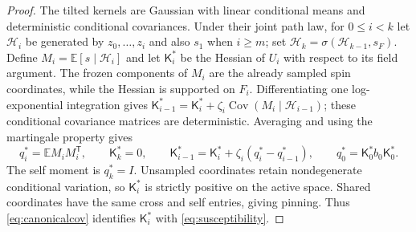 \documentclass[11pt]{article}
\numberwithin{equation}{section}
\theoremstyle{definition}
\newcommand{\E}{\mathbb E}
\newcommand{\Cov}{\operatorname{Cov}}
\begin{document}
\begin{proof}
The tilted kernels are Gaussian with linear conditional means and deterministic conditional covariances. Under their joint path law, for $0\le i<k$ let $\mathcal H_i$ be generated by $z_0,\ldots,z_i$ and also $s_1$ when $i\ge m$; set $\mathcal H_k=\sigma(\mathcal H_{k-1},s_F)$. Define
$M_i=\E[s\mid\mathcal H_i]$ and let $\mathsf K_i^*$ be the Hessian of $U_i$ with respect to its field argument. The frozen components of $M_i$ are the already sampled spin coordinates, while the Hessian is supported on $F_i$. Differentiating one log-exponential integration gives
$\mathsf K_{i-1}^*=\mathsf K_i^*+\zeta_i\Cov(M_i\mid\mathcal H_{i-1})$;
these conditional covariance matrices are deterministic. Averaging and using the martingale property gives
\begin{equation}\label{eq:canonicalcov}
q_i^*=\E M_iM_i^{\mathsf T},\qquad
\mathsf K_k^*=0,\qquad
\mathsf K_{i-1}^*=\mathsf K_i^*+\zeta_i(q_i^*-q_{i-1}^*),\qquad
q_0^*=\mathsf K_0^*b_0\mathsf K_0^*.
\end{equation}
The self moment is $q_k^*=I$. Unsampled coordinates retain nondegenerate conditional variation, so $\mathsf K_i^*$ is strictly positive on the active space. Shared coordinates have the same cross and self entries, giving pinning. Thus \eqref{eq:canonicalcov} identifies $\mathsf K_i^*$ with \eqref{eq:susceptibility}.


\end{proof}
\end{document}
